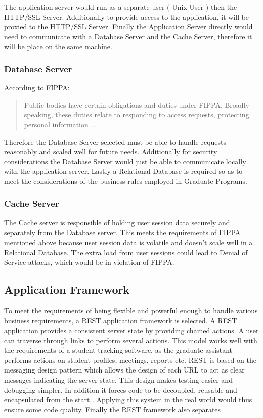 \documentclass{journal}
\begin{document}
The application server would run as a separate user ( Unix User ) then the HTTP/SSL Server. Additionally to provide access to the application, it will be proxied to the HTTP/SSL Server. 
Finally the Application Server directly would need to communicate with a Database Server and the Cache Server, therefore it will be place on the same machine.

\subsubsection{Database Server}

According to FIPPA:
\begin{quote}
Public bodies have certain obligations and duties under FIPPA.  Broadly speaking, these duties relate to responding to access requests, protecting personal information ... \cite{FIPPA}
\end{quote}
Therefore the Database Server selected must be able to handle requests reasonably and scaled well for future needs. Additionally for security considerations the Database Server would just be able to 
communicate locally with the application server. Lastly a Relational Database is required so as to meet the considerations of the business rules employed in Graduate Programs. 

\subsubsection{Cache Server}

The Cache server is responsible of holding user session data securely and separately from the Database server. This meets the requirements of FIPPA mentioned above because user session data is volatile and doesn't scale well in a Relational Database. The extra load from user sessions could lead to Denial of Service attacks, which would be in violation of FIPPA. 

\subsection{Application Framework}

To meet the requirements of being flexible and powerful enough to handle various business requirements, a REST application framework is selected. A REST application provides a consistent server state by providing chained actions. A user can traverse through links to perform several actions. This model works well with the requirements of a student tracking software, as the graduate assistant performs actions on student profiles, meetings, reports etc. REST is based on the messaging design pattern which allows the design of each URL to act as clear messages indicating the server state. This design makes testing easier and debugging simpler. In addition it forces code to be decoupled, reusable and encapsulated from the start \cite{REST}. Applying this system in the real world would thus ensure some code quality. Finally the REST framework also separates 
\end{document}
